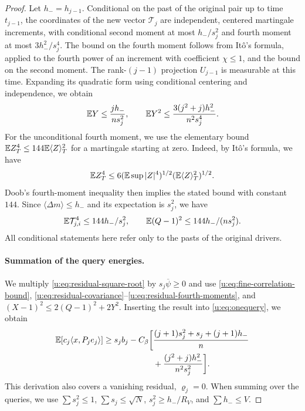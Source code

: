 \begin{proof}
Let $h_-=h_{j-1}$. Conditional on the past of the original pair up to time
$t_{j-1}$, the coordinates of the new vector $\mathcal T_j$
are independent, centered martingale increments, with conditional
second moment at most $h_-/s_j^2$ and fourth moment at most
$3h_-^2/s_j^4$. The bound on the fourth moment follows from It\^o's formula, applied to
the fourth power of an increment with coefficient $\chi\le1$, and the
bound on the second moment. The rank-$(j-1)$ projection $U_{j-1}$
is measurable at this time. Expanding its quadratic form using
conditional centering and independence, we obtain
\begin{equation}\label{u:eq:residual-projection-moments}
 \mathbb E Y\le\frac{j h_-}{ns_j^2},\qquad
 \mathbb E Y^2\le\frac{3(j^2+j)h_-^2}{n^2s_j^4}.
\end{equation}
For the unconditional fourth moment, we use the elementary bound
$\mathbb E Z_T^4\le144\mathbb E\langle Z\rangle_T^2$ for a martingale starting at
zero. Indeed, by It\^o's formula, we have
\[
 \mathbb E Z_T^4\le6(\mathbb E\sup|Z|^4)^{1/2}
                 (\mathbb E\langle Z\rangle_T^2)^{1/2}.
\]
Doob's fourth-moment inequality then implies the stated bound with
constant $144$.
Since $\langle\Delta m\rangle\le h_-$ and its expectation is $s_j^2$, we have
\begin{equation}\label{u:eq:residual-fourth-moments}
 \mathbb E \mathcal T_{j,i}^4\le144h_-/s_j^2,\qquad
 \mathbb E(Q-1)^2\le144h_-/(ns_j^2).
\end{equation}
All conditional statements here refer only to the pasts of the original drivers.

\paragraph{Summation of the query energies.}
We multiply \eqref{u:eq:residual-square-root} by $s_j\overline\psi\ge0$ and use \eqref{u:eq:fine-correlation-bound}, \eqref{u:eq:residual-covariance}--\eqref{u:eq:residual-fourth-moments},
and $(X-1)^2\le2(Q-1)^2+2Y^2$. Inserting the result into \eqref{u:eq:onequery}, we obtain
\begin{equation}\label{u:eq:onequery-energy-bound}
 \begin{aligned}
 \mathbb E[c_j\langle x,P_je_j\rangle]\ge s_jb_j-C_\beta\biggl[
 &\frac{(j+1)s_j^2+s_j+(j+1)h_-}{n}\\
 &+\frac{(j^2+j)h_-^2}{n^2s_j^2}\biggr].
 \end{aligned}
\end{equation}
This derivation also covers a vanishing residual, $\varrho_j=0$.
When summing over the queries, we use $\sum s_j^2\le1$, $\sum s_j\le\sqrt N$,
$s_j^2\ge h_-/R_V$, and $\sum h_-\le V$.


\end{proof}
